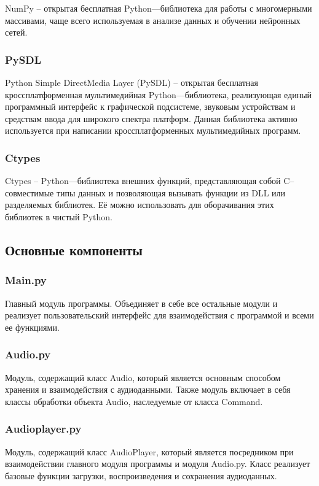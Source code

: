 NumPy -- открытая бесплатная Python—библиотека для работы с многомерными массивами, чаще всего используемая в анализе данных и обучении нейронных сетей.

\subsubsection{PySDL}

Python Simple DirectMedia Layer (PySDL) -- открытая бесплатная кроссплатформенная мультимедийная Python—библиотека, реализующая единый программный интерфейс к графической подсистеме, звуковым устройствам и средствам ввода для широкого спектра платформ. Данная библиотека активно используется при написании кроссплатформенных мультимедийных программ.

\subsubsection{Ctypes}

Ctypes -- Python—библиотека внешних функций, представляющая собой C--совместимые типы данных и позволяющая вызывать функции из DLL или разделяемых библиотек. Её можно использовать для оборачивания этих библиотек в чистый Python.

\subsection{Основные компоненты}
\subsubsection{Main.py}
Главный модуль программы. Объединяет в себе все остальные модули и реализует пользовательский интерфейс для взаимодействия с программой и всеми ее функциями.

\subsubsection{Audio.py}
Модуль, содержащий класс Audio, который является основным способом хранения и взаимодействия с аудиоданными. Также модуль включает в себя классы обработки объекта Audio, наследуемые от класса Command.

\subsubsection{Audioplayer.py}
Модуль, содержащий класс AudioPlayer, который является посредником при взаимодействии главного модуля программы и модуля Audio.py. Класс реализует базовые функции загрузки, воспроизведения и сохранения аудиоданных.

